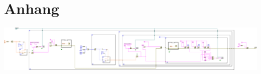 \newpage
\section{Anhang}

\minipage{\linewidth}
    \begin{center}
        \captionsetup{type=figure}
        \begin{adjustbox}{max height=0.5\textheight, keepaspectratio}
            \includegraphics[angle=90, origin=c]{png/LabVIEW}
        \end{adjustbox}
        \label{fig:LabVIEWSkript}
    \end{center}
\endminipage
